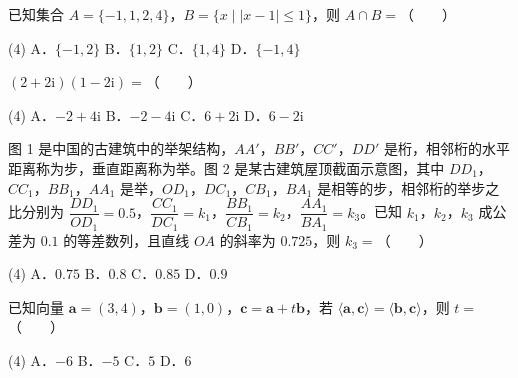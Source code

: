 \begin{question}
已知集合 $A=\{-1,1,2,4\}$，$B=\{x\mid|x-1|\le1\}$，则 $A\cap B=$\mbox{（　　）}

\begin{gkopts}(4)
\task A．$\{-1,2\}$
\task B．$\{1,2\}$
\task C．$\{1,4\}$
\task D．$\{-1,4\}$
\end{gkopts}

\end{question}
\begin{question}
$(2+2\mathrm i)(1-2\mathrm i)=$\mbox{（　　）}

\begin{gkopts}(4)
\task A．$-2+4\mathrm i$
\task B．$-2-4\mathrm i$
\task C．$6+2\mathrm i$
\task D．$6-2\mathrm i$
\end{gkopts}

\Needspace{0.4\textheight}
\end{question}
\begin{question}
图 1 是中国的古建筑中的举架结构，$AA'$，$BB'$，$CC'$，$DD'$ 是桁，相邻桁的水平距离称为步，垂直距离称为举。图 2 是某古建筑屋顶截面示意图，其中 $DD_1$，$CC_1$，$BB_1$，$AA_1$ 是举，$OD_1$，$DC_1$，$CB_1$，$BA_1$ 是相等的步，相邻桁的举步之比分别为 $\dfrac{DD_1}{OD_1}=0.5$，$\dfrac{CC_1}{DC_1}=k_1$，$\dfrac{BB_1}{CB_1}=k_2$，$\dfrac{AA_1}{BA_1}=k_3$。已知 $k_1$，$k_2$，$k_3$ 成公差为 $0.1$ 的等差数列，且直线 $OA$ 的斜率为 $0.725$，则 $k_3=$\mbox{（　　）}
\nopagebreak[4]
\begin{center}\end{center}
\nopagebreak[4]
\nopagebreak[4]
\begin{center}\end{center}
\nopagebreak[4]
\begin{gkopts}(4)
\task A．$0.75$
\task B．$0.8$
\task C．$0.85$
\task D．$0.9$
\end{gkopts}

\end{question}
\begin{question}
已知向量 $\boldsymbol a=(3,4)$，$\boldsymbol b=(1,0)$，$\boldsymbol c=\boldsymbol a+t\boldsymbol b$，若 $\langle\boldsymbol a,\boldsymbol c\rangle=\langle\boldsymbol b,\boldsymbol c\rangle$，则 $t=$\mbox{（　　）}

\begin{gkopts}(4)
\task A．$-6$
\task B．$-5$
\task C．$5$
\task D．$6$
\end{gkopts}

\end{question}
